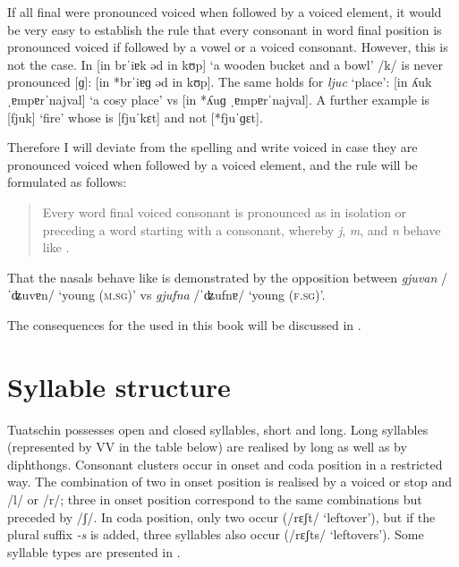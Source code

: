 If all final  were pronounced voiced when followed by a voiced element, it would be very easy to establish the rule that every  consonant in word final position is pronounced voiced if followed by a vowel or a voiced consonant. However, this is not the case. In [in brˈiɐk əd in kʊp] `a wooden bucket and a bowl' /k/ is never pronounced [ɡ]: [in *brˈiɐɡ əd in kʊp].  The same holds for \textit{ljuc} `place': [in ʎuk ˌɐmpɐrˈnajval] `a cosy place' vs [in *ʎuɡ ˌɐmpɐrˈnajval]. A further example is [fjuk] `fire' whose  is [fjuˈkɛt] and not [*fjuˈɡɛt].

Therefore I will deviate from the  spelling and write voiced  in case they are pronounced voiced when followed by a voiced element, and the rule will be formulated as follows:

\begin{quote}
Every word final voiced consonant is pronounced as  in isolation or preceding a word starting with a  consonant, whereby \textit{j}, \textit{m}, and \textit{n} behave like .
\end{quote}

That the nasals behave like  is demonstrated by the opposition between \textit{gjuvan} /ˈʥuvɐn/ `young (\textsc{m.sg})' vs \textit{gjufna} /ˈʥufnɐ/ `young (\textsc{f.sg})'.

The consequences for the  used in this book will be discussed in .


\section{Syllable structure}\label{sec:2.4}
Tuatschin possesses open and closed syllables, short and long. Long syllables (represented by VV in the table below) are realised by long  as well as by diphthongs. Consonant clusters occur in onset and coda position in a restricted way. The combination of two  in onset position is realised by a voiced or  stop and /l/ or /r/; three  in onset position correspond to the same combinations but preceded by /ʃ/. In coda position, only two  occur (/rɛʃt/ `leftover'), but if the plural suffix \mbox{\textit{-s}} is added, three syllables also occur (/rɛʃts/ `leftovers'). Some syllable types are presented in .


